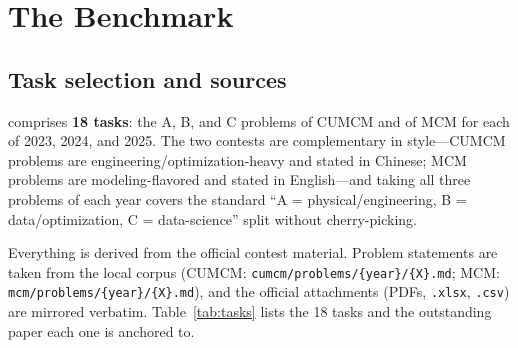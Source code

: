 \section{The \bench{} Benchmark}
\label{sec:benchmark}

\subsection{Task selection and sources}
\bench{} comprises \textbf{18 tasks}: the A, B, and C problems of CUMCM and of MCM for each of 2023, 2024, and 2025. The two contests are complementary in style---CUMCM problems are engineering/optimization-heavy and stated in Chinese; MCM problems are modeling-flavored and stated in English---and taking all three problems of each year covers the standard ``A = physical/engineering, B = data/optimization, C = data-science'' split without cherry-picking.

Everything is derived from the official contest material. Problem statements are taken from the local corpus (CUMCM: \texttt{cumcm/problems/\{year\}/\{X\}.md}; MCM: \texttt{mcm/problems/\{year\}/\{X\}.md}), and the official attachments (PDFs, \texttt{.xlsx}, \texttt{.csv}) are mirrored verbatim. Table~\ref{tab:tasks} lists the 18 tasks and the outstanding paper each one is anchored to.

